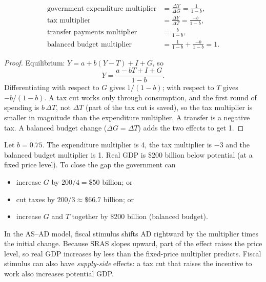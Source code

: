 \begin{theorem}
\begin{align*}
  \text{government expenditure multiplier} &= \frac{\Delta Y}{\Delta G} = \frac{1}{1 - b},\\
  \text{tax multiplier} &= \frac{\Delta Y}{\Delta T} = \frac{-b}{1 - b},\\
  \text{transfer payments multiplier} &= \frac{b}{1 - b},\\
  \text{balanced budget multiplier} &= \frac{1}{1 - b} + \frac{-b}{1 - b} = 1.
\end{align*}
\end{theorem}

\begin{proof}
Equilibrium: $Y = a + b(Y - T) + I + G$, so
\[
  Y = \frac{a - bT + I + G}{1 - b}.
\]
Differentiating with respect to $G$ gives $1/(1 - b)$; with respect to $T$ gives
$-b/(1 - b)$. A tax cut works only through consumption, and the first round of spending is
$b\,\Delta T$, not $\Delta T$ (part of the tax cut is saved), so the tax multiplier is
smaller in magnitude than the expenditure multiplier. A transfer is a negative tax. A
balanced budget change ($\Delta G = \Delta T$) adds the two effects to get 1.
\end{proof}

\begin{example}
Let $b = 0.75$. The expenditure multiplier is 4, the tax multiplier is $-3$ and the
balanced budget multiplier is 1. Real GDP is \$200 billion below potential (at a fixed
price level). To close the gap the government can
\begin{itemize}
  \item increase $G$ by $200/4 = \$50$ billion; or
  \item cut taxes by $200/3 \approx \$66.7$ billion; or
  \item increase $G$ and $T$ together by \$200 billion (balanced budget).
\end{itemize}
\end{example}

In the AS--AD model, fiscal stimulus shifts AD rightward by the multiplier times the
initial change. Because SRAS slopes upward, part of the effect raises the price level, so
real GDP increases by less than the fixed-price multiplier predicts. Fiscal stimulus can
also have \emph{supply-side} effects: a tax cut that raises the incentive to work also
increases potential GDP.

